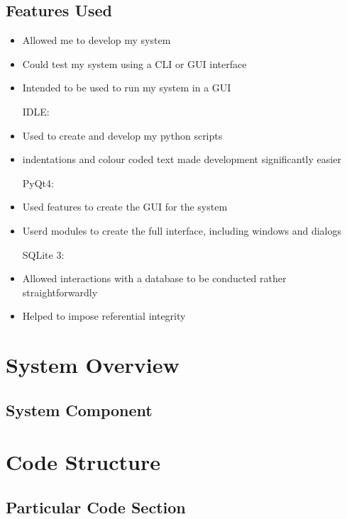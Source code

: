 \subsection{Features Used}

\begin{itemize}

Python 3.4:

    \item Allowed me to develop my system
    \item Could test my system using a CLI or GUI interface
    \item Intended to be used to run my system in a GUI

IDLE:
    
    \item Used to create and develop my python scripts
    \item indentations and colour coded text made development significantly easier

PyQt4:

    \item Used features to create the GUI for the system
    \item Userd modules to create the full interface, including windows and dialogs

SQLite 3:

    \item Allowed interactions with a database to be conducted rather straightforwardly
    \item Helped to impose referential integrity

\end{itemize}

\section{System Overview}
 
\subsection{System Component}



\section{Code Structure}

\subsection{Particular Code Section}
\begin{comment}
\begin{figure}[H]
    \pythonfile[firstline=5,lastline=10]{./tex/function_programs/print_function.py}
    \caption{The print() function} \label{fig:print_function}
\end{figure}
\end{comment}

